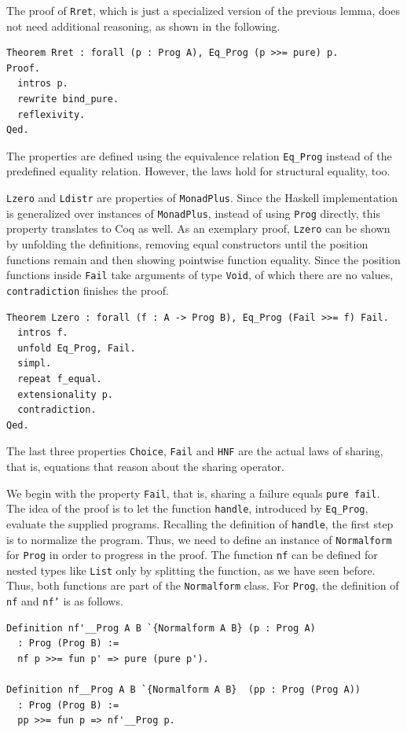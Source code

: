 \documentclass[a4paper, 11pt, fleqn, twoside]{scrreprt}
\newcommand{\hinl}[1]{\texttt{#1}}
\newcommand{\cinl}[1]{\texttt{#1}}
\begin{document}
The proof of \cinl{Rret}, which is just a specialized version of the previous lemma, does not need additional reasoning, as shown in the following.

\begin{verbatim}
Theorem Rret : forall (p : Prog A), Eq_Prog (p >>= pure) p.
Proof.
  intros p.
  rewrite bind_pure.
  reflexivity.
Qed.
\end{verbatim}

The properties are defined using the equivalence relation \cinl{Eq_Prog} instead of the predefined equality relation.
However, the laws hold for structural equality, too.

\cinl{Lzero} and \cinl{Ldistr} are properties of \hinl{MonadPlus}.
Since the Haskell implementation is generalized over instances of \cinl{MonadPlus}, instead of using \cinl{Prog} directly, this property translates to Coq as well.
As an exemplary proof, \cinl{Lzero} can be shown by unfolding the definitions, removing equal constructors until the position functions remain and then showing pointwise function equality.
Since the position functions inside \cinl{Fail} take arguments of type \cinl{Void}, of which there are no values, \cinl{contradiction} finishes the proof.

\begin{verbatim}
Theorem Lzero : forall (f : A -> Prog B), Eq_Prog (Fail >>= f) Fail.
  intros f.
  unfold Eq_Prog, Fail.
  simpl.
  repeat f_equal.
  extensionality p.
  contradiction.
Qed.
\end{verbatim}

The last three properties \cinl{Choice}, \cinl{Fail} and \cinl{HNF} are the actual laws of sharing, that is, equations that reason about the sharing operator.

We begin with the property \cinl{Fail}, that is, sharing a failure equals \cinl{pure fail}.
The idea of the proof is to let the function \cinl{handle}, introduced by \cinl{Eq_Prog}, evaluate the supplied programs.
Recalling the definition of \cinl{handle}, the first step is to normalize the program.
Thus, we need to define an instance of \cinl{Normalform} for \cinl{Prog} in order to progress in the proof.
The function \cinl{nf} can be defined for nested types like \cinl{List} only by splitting the function, as we have seen before.
Thus, both functions are part of the \cinl{Normalform} class.
For \cinl{Prog}, the definition of \cinl{nf} and \cinl{nf'} is as follows.

\begin{verbatim}
Definition nf'__Prog A B `{Normalform A B} (p : Prog A) 
  : Prog (Prog B) :=
  nf p >>= fun p' => pure (pure p').

Definition nf__Prog A B `{Normalform A B}  (pp : Prog (Prog A)) 
  : Prog (Prog B) :=
  pp >>= fun p => nf'__Prog p.
\end{verbatim}
\end{document}
